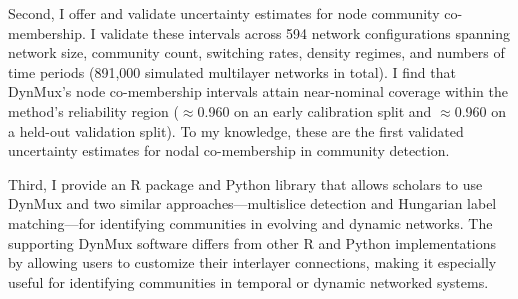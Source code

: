 \documentclass[11pt, letterpaper]{article}
\begin{document}
Second, I offer and validate uncertainty estimates for node community co-membership. I validate these intervals across 594 network configurations spanning network size, community count, switching rates, density regimes, and numbers of time periods (891,000 simulated multilayer networks in total). I find that DynMux's node co-membership intervals attain near-nominal coverage within the method's reliability region ($\approx$0.960 on an early calibration split and $\approx$0.960 on a held-out validation split). To my knowledge, these are the first validated uncertainty estimates for nodal co-membership in community detection.

Third, I provide an R package and Python library that allows scholars to use DynMux and two similar approaches---multislice detection and Hungarian label matching---for identifying communities in evolving and dynamic networks. The supporting DynMux software differs from other R and Python implementations by allowing users to customize their interlayer connections, making it especially useful for identifying communities in temporal or dynamic networked systems.
\end{document}
